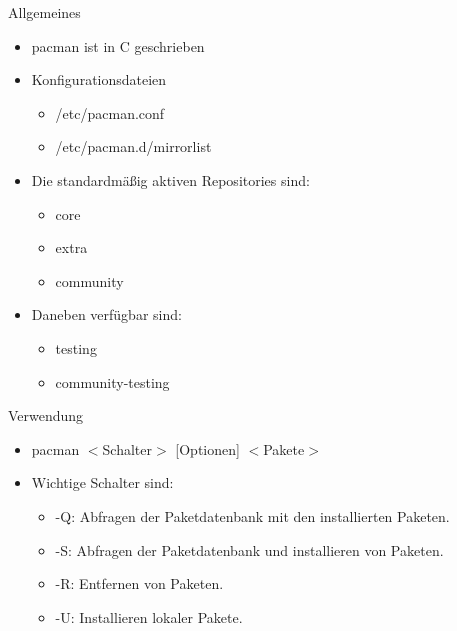 
\begin{slide}{Allgemeines}
	\begin{itemize}
		\item{pacman ist in C geschrieben}
		\item{Konfigurationsdateien
			\begin{itemize}
				\item{/etc/pacman.conf}
				\item{/etc/pacman.d/mirrorlist}
			\end{itemize}
		}
		\item{Die standardm\"{a}ßig aktiven Repositories sind:
			\begin{itemize}
				\item{core}
				\item{extra}
				\item{community}
			\end{itemize}
		}
		\item{Daneben verf\"{u}gbar sind:
			\begin{itemize}
				\item{testing}
				\item{community-testing}
			\end{itemize}
		}
	\end{itemize}
\end{slide}

\begin{slide}{Verwendung}
	\begin{itemize}
		\item{pacman $<$Schalter$>$ [Optionen] $<$Pakete$>$}
		\item{Wichtige Schalter sind:
			\begin{itemize}
				\item{-Q: Abfragen der Paketdatenbank mit den installierten
					Paketen.}
				\item{-S: Abfragen der Paketdatenbank und installieren von
					Paketen.}
				\item{-R: Entfernen von Paketen.}
				\item{-U: Installieren lokaler Pakete.}
			\end{itemize}
		}
	\end{itemize}
\end{slide}


